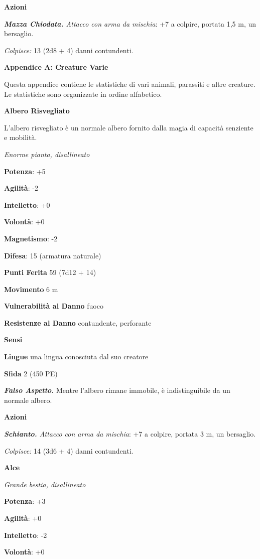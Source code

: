 \begin{multicols}{2}
\textbf{Azioni}

\emph{\textbf{Mazza Chiodata.} Attacco con arma da mischia}: +7 a
colpire, portata 1,5 m, un bersaglio.

\emph{Colpisce:} 13 (2d8 + 4) danni contundenti.



\textbf{Appendice A: Creature Varie}

Questa appendice contiene le statistiche di vari animali, parassiti e
altre creature. Le statistiche sono organizzate in ordine alfabetico.

\textbf{Albero Risvegliato}

L'albero risvegliato è un normale albero fornito dalla magia di capacità
senziente e mobilità.

\emph{Enorme pianta, disallineato}

\textbf{Potenza}: +5

\textbf{Agilità}: -2

\textbf{Intelletto}: +0

\textbf{Volontà}: +0

\textbf{Magnetismo}: -2

\textbf{Difesa}: 15 (armatura naturale)

\textbf{Punti Ferita} 59 (7d12 + 14)

\textbf{Movimento} 6 m

\textbf{Vulnerabilità al Danno} fuoco

\textbf{Resistenze al Danno} contundente, perforante

\textbf{Sensi} 

\textbf{Lingue} una lingua conosciuta dal suo creatore

\textbf{Sfida} 2 (450 PE)

\emph{\textbf{Falso Aspetto.}} Mentre l'albero rimane immobile, è
indistinguibile da un normale albero.

\textbf{Azioni}

\emph{\textbf{Schianto.} Attacco con arma da mischia}: +7 a colpire,
portata 3 m, un bersaglio.

\emph{Colpisce:} 14 (3d6 + 4) danni contundenti.

\textbf{Alce}

\emph{Grande bestia, disallineato}

\textbf{Potenza}: +3

\textbf{Agilità}: +0

\textbf{Intelletto}: -2

\textbf{Volontà}: +0


\end{multicols}
